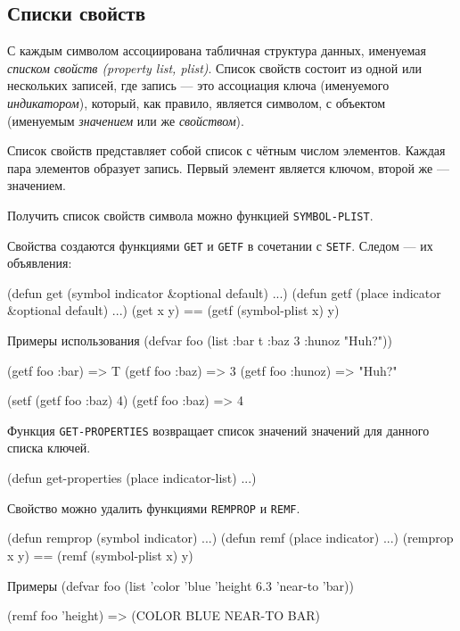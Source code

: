 \subsection{Списки свойств}
С каждым символом ассоциирована табличная структура данных, именуемая \emph{списком свойств (property list, plist)}. Список свойств состоит из одной или нескольких записей, где запись — это ассоциация ключа (именуемого \emph{индикатором}), который, как правило, является символом, с объектом (именуемым \emph{значением} или же \emph{свойством}).

Список свойств представляет собой список с чётным числом элементов. Каждая пара элементов образует запись. Первый элемент является ключом, второй же — значением.

Получить список свойств символа можно функцией \lstinline{SYMBOL-PLIST}.

Свойства создаются функциями \lstinline{GET} и \lstinline{GETF} в сочетании с \lstinline{SETF}. Следом — их объявления:
\begin{cllst}{}{}
(defun get (symbol indicator &optional default) ...)
(defun getf (place indicator &optional default) ...)
(get x y) == (getf (symbol-plist x) y)
\end{cllst}

\begin{cllst}{Примеры использования}{}
(defvar foo (list :bar t :baz 3 :hunoz "Huh?"))

(getf foo :bar)   => T
(getf foo :baz)   => 3
(getf foo :hunoz) => "Huh?"

(setf (getf foo :baz) 4)
(getf foo :baz)  => 4
\end{cllst}

Функция \lstinline{GET-PROPERTIES} возвращает список значений значений для данного списка ключей.
\begin{cllst}{}{}
(defun get-properties (place indicator-list) ...)
\end{cllst}

Свойство можно удалить функциями \lstinline{REMPROP} и \lstinline{REMF}.
\begin{cllst}{}{}
(defun remprop (symbol indicator) ...)
(defun remf (place indicator) ...)
(remprop x y) == (remf (symbol-plist x) y)
\end{cllst}

\begin{cllst}{Примеры}{}
(defvar foo (list 'color 'blue 'height 6.3 'near-to 'bar))

(remf foo 'height) => (COLOR BLUE NEAR-TO BAR)
\end{cllst}

